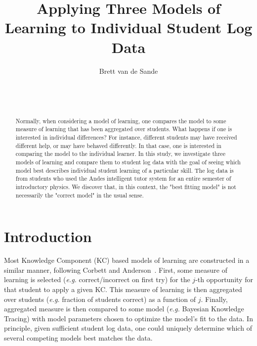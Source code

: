 \documentclass{edm_template}
\begin{document}
\title{Applying Three Models of Learning to Individual Student Log Data}
\author{
\alignauthor
      Brett van de Sande\\
       \\
       \\
       \\
}

\maketitle

\begin{abstract}
Normally, when considering a model of learning, one compares the model
to some measure of learning that has been aggregated over students.
What happens if one is interested in individual differences?  For
instance, different students may have received different help, or may
have behaved differently.  In that case, one is interested in
comparing the model to the individual learner.  In this study, we
investigate three models of learning and compare them to student log
data with the goal of seeing which model best describes individual
student learning of a particular skill.  The log data is from students
who used the Andes intelligent tutor system for an entire semester of
introductory physics.  We discover that, in this context, the "best
fitting model" is not necessarily the "correct model" in the usual
sense.
\end{abstract}



\section{Introduction}


Most Knowledge Component (KC) \cite{vanlehn_behavior_2006}
based models of learning are constructed
in a similar manner, following Corbett and Anderson~\citeyear{corbett_knowledge_1995}.
First, some measure of learning is selected ({\em e.g.} correct/incorrect
on first try) for the $j$-th opportunity for that student to apply a given KC.  
This measure of learning is then aggregated over students 
({\em e.g.} fraction of students correct) as a function of $j$.
Finally, aggregated measure is then compared to some model
({\em e.g.} Bayesian Knowledge Tracing) with model parameters
chosen to optimize the model's fit to the data.
In principle, given sufficient student log data, one could uniquely
determine which of several competing models best matches the
data.
\end{document}
